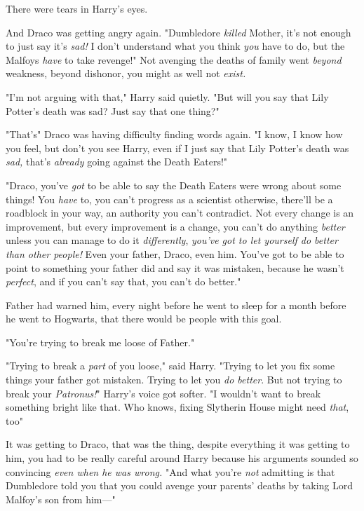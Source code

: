 There were tears in Harry's eyes.

And Draco was getting angry again. "Dumbledore \emph{killed} Mother, it's not
enough to just say it's \emph{sad!} I don't understand what you think
\emph{you} have to do, but the Malfoys \emph{have} to take revenge!" Not
avenging the deaths of family went \emph{beyond} weakness, beyond dishonor, you
might as well not \emph{exist.}

"I'm not arguing with that," Harry said quietly. "But will you say that Lily
Potter's death was sad? Just say that one thing?"

"That's{\el}" Draco was having difficulty finding words again. "I know, I
know how you feel, but don't you see Harry, even if I just say that Lily
Potter's death was \emph{sad,} that's \emph{already} going against the Death
Eaters!"

"Draco, you've \emph{got} to be able to say the Death Eaters were wrong about
some things! You \emph{have} to, you can't progress as a scientist otherwise,
there'll be a roadblock in your way, an authority you can't contradict. Not
every change is an improvement, but every improvement is a change, you can't do
anything \emph{better} unless you can manage to do it \emph{differently},
\emph{you've got to let yourself do better than other people!} Even your
father, Draco, even him. You've got to be able to point to something your
father did and say it was mistaken, because he wasn't \emph{perfect}, and if
you can't say that, you can't do better."

Father had warned him, every night before he went to sleep for a month before
he went to Hogwarts, that there would be people with this goal.

"You're trying to break me loose of Father."

"Trying to break a \emph{part} of you loose," said Harry. "Trying to let you
fix some things your father got mistaken. Trying to let you \emph{do better}.
But not{\el} trying to break your \emph{Patronus!}" Harry's voice got
softer. "I wouldn't want to break something bright like that. Who knows, fixing
Slytherin House might need \emph{that}, too{\el}"

It was getting to Draco, that was the thing, despite everything it was getting
to him, you had to be really careful around Harry because his arguments sounded
so convincing \emph{even when he was wrong.} "And what you're \emph{not}
admitting is that Dumbledore told you that you could avenge your parents'
deaths by taking Lord Malfoy's son from him\mbox{---}"


